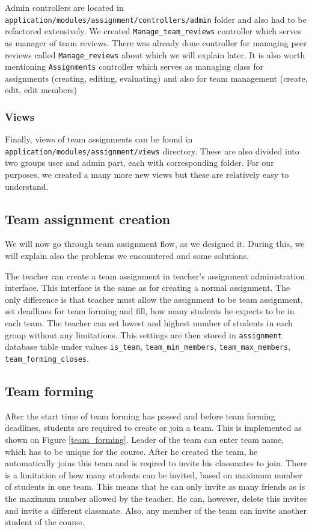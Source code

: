 Admin controllers are located in \\ \texttt{application/modules/assignment/controllers/admin} folder and also had to be refactored extensively. We created \texttt{Manage\_team\_reviews} controller which serves as manager of team reviews. There was already done controller for managing peer reviews called \texttt{Manage\_reviews} about which we will explain later. It is also worth mentioning \texttt{Assignments} controller which serves as managing class for assignments (creating, editing, evaluating) and also for team management (create, edit, edit members)

\subsubsection{Views}
Finally, views of team assignments can be found in \\ \texttt{application/modules/assignment/views} directory. These are also divided into two groups user and admin part, each with corresponding folder. For our purposes, we created a many more new views but these are relatively easy to understand.

\subsection{Team assignment creation}
We will now go through team assignment flow, as we designed it. During this, we will explain also the problems we encountered and some solutions.

The teacher can create a team assignment in teacher's assignment administration interface. This interface is the same as for creating a normal assignment. The only difference is that teacher must allow the assignment to be team assignment, set deadlines for team forming and fill, how many students he expects to be in each team. The teacher can set lowest and highest number of students in each group without any limitations. This settings are then stored in \texttt{assignment} database table under values \texttt{is\_team}, \texttt{team\_min\_members}, \texttt{team\_max\_members}, \texttt{team\_forming\_closes}.

\subsection{Team forming}
After the start time of team forming has passed and before team forming deadlines, students are required to create or join a team. This is implemented as shown on Figure \ref{team_forming}. Leader of the team can enter team name, which has to be unique for the course. After he created the team, he automatically joins this team and is reqired to invite his classmates to join. There is a limitation of how many students can be invited, based on maximum number of students in one team. This means that he can only invite as many friends as is the maximum number allowed by the teacher. He can, however, delete this invites and invite a different classmate. Also, any member of the team can invite another student of the course.

